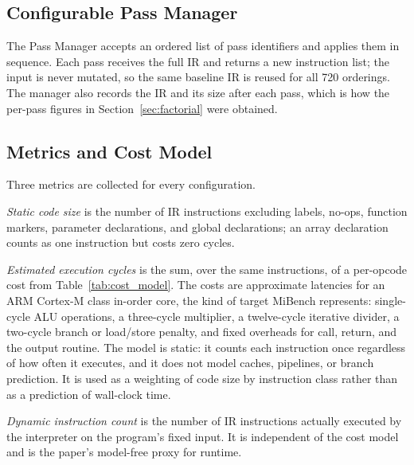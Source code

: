 \documentclass[conference]{IEEEtran}
\begin{document}
\subsection{Configurable Pass Manager}
The Pass Manager accepts an ordered list of pass identifiers and applies them in sequence. Each pass receives the full IR and returns a new instruction list; the input is never mutated, so the same baseline IR is reused for all 720 orderings. The manager also records the IR and its size after each pass, which is how the per-pass figures in Section~\ref{sec:factorial} were obtained.

\subsection{Metrics and Cost Model}
\label{sec:metrics}
Three metrics are collected for every configuration.

\textit{Static code size} is the number of IR instructions excluding labels, no-ops, function markers, parameter declarations, and global declarations; an array declaration counts as one instruction but costs zero cycles.

\textit{Estimated execution cycles} is the sum, over the same instructions, of a per-opcode cost from Table~\ref{tab:cost_model}. The costs are approximate latencies for an ARM Cortex-M class in-order core, the kind of target MiBench represents: single-cycle ALU operations, a three-cycle multiplier, a twelve-cycle iterative divider, a two-cycle branch or load/store penalty, and fixed overheads for call, return, and the output routine. The model is static: it counts each instruction once regardless of how often it executes, and it does not model caches, pipelines, or branch prediction. It is used as a weighting of code size by instruction class rather than as a prediction of wall-clock time.

\textit{Dynamic instruction count} is the number of IR instructions actually executed by the interpreter on the program's fixed input. It is independent of the cost model and is the paper's model-free proxy for runtime.
\end{document}
